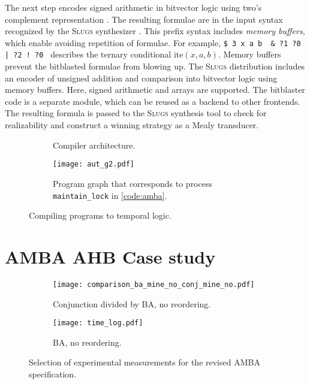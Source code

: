 \documentclass[copyright]{eptcs}
\begin{document}
The next step encodes signed arithmetic in bitvector logic using two's complement representation \cite{Kroening08}.
The resulting formulae are in the input syntax recognized by the \textsc{Slugs} synthesizer \cite{Ehlers14synt}.
This prefix syntax includes {\em memory buffers}, which enable avoiding repetition of formulae.
For example, \verb+$ 3 x a b  & ?1 ?0  | ?2 ! ?0 + describes the ternary conditional $\mathrm{ite}(x, a, b)$.
Memory buffers prevent the bitblasted formulae from blowing up.
The \textsc{Slugs} distribution includes an encoder of unsigned addition and comparison into bitvector logic using memory buffers.
Here, signed arithmetic and arrays are supported.
The bitblaster code is a separate module, which can be reused as a backend to other frontends.
The resulting formula is passed to the \textsc{Slugs} synthesis tool to check for realizability and construct a winning strategy as a Mealy transducer.


\begin{figure}
\begin{subfigure}{0.6\textwidth}
\centering
{}
\caption{Compiler architecture.}
\label{fig:compiler_architecture}
\end{subfigure}
\begin{subfigure}{0.35\textwidth}
\centering
\texttt{[image: aut\_g2.pdf]}
\caption{Program graph that corresponds to process \texttt{maintain\_lock} in \cref{code:amba}.}
\label{fig:aut_g2}
\end{subfigure}
\caption{Compiling programs to temporal logic.}
\end{figure}


\section{AMBA AHB Case study}
\label{sec:amba}


\begin{figure}
\centering
\begin{subfigure}{0.8\textwidth}
\texttt{[image: comparison\_ba\_mine\_no\_conj\_mine\_no.pdf]}
\caption{Conjunction divided by BA, no reordering.}
\label{subfig:comparison_ba_mine_no_conj_mine_no}
\end{subfigure}
\begin{subfigure}{0.6\textwidth}
\texttt{[image: time\_log.pdf]}
\caption{BA, no reordering.}
\label{subfig:time_log}
\end{subfigure}
\caption{Selection of experimental measurements for the revised AMBA specification.}
\label{fig:amba}
\end{figure}
\end{document}
